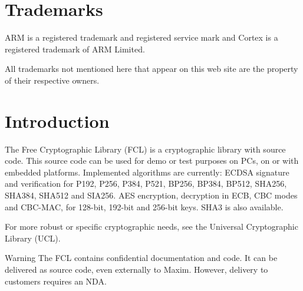  \hypertarget{index_trademarks}{}\section{Trademarks}\label{index_trademarks}

\begin{DoxyItemize}
\item A\+RM is a registered trademark and registered service mark and Cortex is a registered trademark of A\+RM Limited.
\item All trademarks not mentioned here that appear on this web site are the property of their respective owners.
\end{DoxyItemize}\hypertarget{index_Introduction}{}\section{Introduction}\label{index_Introduction}
The Free Cryptographic Library (F\+CL) is a cryptographic library with source code. This source code can be used for demo or test purposes on P\+Cs, on or with embedded platforms. Implemented algorithms are currently\+: E\+C\+D\+SA signature and verification for P192, P256, P384, P521, B\+P256, B\+P384, B\+P512, S\+H\+A256, S\+H\+A384, S\+H\+A512 and S\+I\+A256. A\+ES encryption, decryption in E\+CB, C\+BC modes and C\+B\+C-\/\+M\+AC, for 128-\/bit, 192-\/bit and 256-\/bit keys. S\+H\+A3 is also available.

For more robust or specific cryptographic needs, see the Universal Cryptographic Library (U\+CL).

\begin{DoxyWarning}{Warning}
The F\+CL contains confidential documentation and code. It can be delivered as source code, even externally to Maxim. However, delivery to customers requires an N\+DA.
\end{DoxyWarning}

